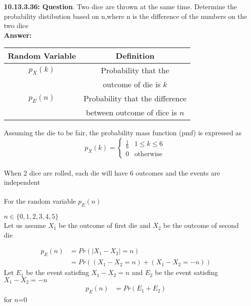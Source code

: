 \documentclass[journal,12pt,twocolumn]{IEEEtran}
\begin{document}
\textbf{10.13.3.36: Question}. Two dice are thrown at the same time. Determine the probability distibution based on n,where n is the difference
of the numbers on the two dice \\
\textbf{Answer: }
\begin{table}[hbp]
  \begin{tabular}{| c | c |}
    \hline
    Random Variable & Definition \\\hline
    $p_X(k)$ &Probability that the\\& outcome of die is $k$\\\hline
    $p_E(n)$ &Probability that the difference\\& between outcome of dice is $n$\\\hline
  \end{tabular}
\end{table}

Assuming the die to be fair, the probability mass function (pmf) is expressed as
 \begin{equation}
p_{X}(k) =  
\begin{cases}
    \frac{1}{6} &  1\leq  k\leq 6  \\
    0  & \text{otherwise } 
\end{cases}
\label{eq:1}
\end{equation}\\

When 2 dice are rolled, each die will have 6 outcomes and the events are independent \\\\
For the random variable $p_E(n)$

$n\in \{0,1,2,3,4,5\}$\\

Let us assume $X_1$ be the outcome of first die and $X_2$ be the outcome of second die

\begin{align}
	p_E(n)&=Pr(|X_1-X_2|=n) \nonumber\\
	&=Pr((X_1-X_2=n)+(X_1-X_2=-n))\nonumber
\end{align} 
Let $E_1$ be the event satisfing $X_1 - X_2 = n$ and $E_2$ be the event satisfing $X_1 - X_2 = -n$
\begin{align}
	p_E(n)&=Pr(E_1+E_2) \nonumber
\end{align} 
for $n$=0
\end{document}
